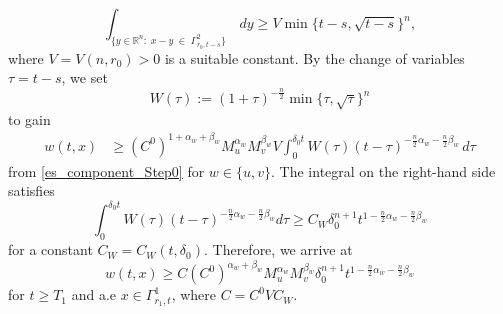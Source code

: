 \documentclass[11pt,reqno]{amsart}
\begin{document}
	\[
	\int_{\{y\in \mathbb R^n:\;x-y\;\in\;\Gamma^2_{r_0,t-s}\}}\,dy\geq V\min\{t-s,\sqrt{t-s}\}^{n},
	\]
	where $V=V(n,r_0)>0$ is a suitable constant. By the change of variables $\tau=t-s$, we set
	\[
	W(\tau):=(1+\tau)^{-\frac{n}{2}}\min\{\tau,\sqrt{\tau}\}^{n}
	\]
	to gain
	\[
	\begin{aligned}
		w(t,x)&\geq (C^0)^{1+\alpha_w+\beta_w} M^{\alpha_w}_{u} M^{\beta_w}_{v} V\int_{0}^{\delta_0t}W(\tau)(t-\tau)^{-\frac{n}{2}\alpha_w-\frac{n}{2}\beta_w}\,d\tau
	\end{aligned}
	\]
	from \eqref{es_component_Step0} for $w\in\{u,v\}$. The integral on the right-hand side satisfies
	\[
	\int_{0}^{\delta_0t}W(\tau)(t-\tau)^{-\frac{n}{2}\alpha_w-\frac{n}{2}\beta_w}d\tau\geq C_{W}\delta_0^{n+1}t^{1-\frac{n}{2}\alpha_w-\frac{n}{2}\beta_w}
	\]
	for a constant $C_W= C_W(t,\delta_0)$. Therefore, we arrive at
	\[
	w(t,x)\geq C(C^0)^{\alpha_w+\beta_w}M^{\alpha_w}_{u}M^{\beta_w}_{v}\delta_0^{n+1}t^{1-\frac{n}{2}\alpha_w-\frac{n}{2}\beta_w}
	\]
	for $t\geq T_1$ and a.e $x\in\Gamma^1_{r_1,t}$, where $C=C^0VC_{W}$. 
	
\end{document}
